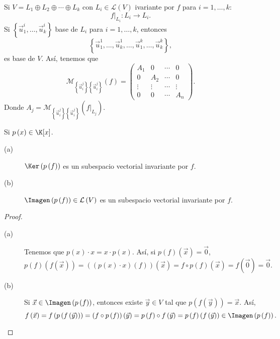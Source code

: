 \begin{observation}
\normalfont Si $\displaystyle V = L_{1} \oplus L_{2} \oplus \cdots \oplus L_{k} $ con $\displaystyle L_{i} \in \mathcal{L}\left(V\right) $ ivariante por $\displaystyle f $ para $\displaystyle i = 1, \ldots, k $:
\[f|_{L_{i}}:L_{i} \to L_{i} .\]
Si $\displaystyle \left\{ \vec{u}^{i}_{1}, \ldots, \vec{u}^{i}_{k}\right\}  $ base de $\displaystyle L_{i} $ para $\displaystyle i = 1, \ldots, k $, entonces 
\[ \left\{ \vec{u}^{1}_{1}, \ldots, \vec{u}^{1}_{k}, \ldots, \vec{u}^{k}_{1}, \ldots, \vec{u}^{k}_{k}\right\}  ,\]
es base de $\displaystyle V $. Así, tenemos que 
\[ \mathcal{M}_{ \left\{ \vec{u}^{j}_{i}\right\} \left\{ \vec{u}^{j}_{i}\right\} }\left(f\right) = \begin{pmatrix} A_{1} & 0 & \cdots & 0 \\
0 & A_{2} & \cdots & 0 \\
\vdots & \vdots & \cdots & \vdots \\
0 & 0 & \cdots & A_{n}\end{pmatrix} .\]
Donde $\displaystyle A_{j} = \mathcal{M}_{ \left\{ \vec{u}^{j}_{i}\right\} \left\{ \vec{u}^{j}_{i}\right\} } \left(f|_{L_{j}}\right)$.
\end{observation}
Si $\displaystyle p\left(x\right) \in \K[x] $.
\begin{fprop}[]
\normalfont 
\begin{description}
\item[(a)] $\displaystyle \Ker\left(p\left(f\right)\right) $ es un subespacio vectorial invariante por $\displaystyle f $.
\item[(b)] $\displaystyle \Imagen\left(p\left(f\right)\right)\in \mathcal{L}\left(V\right) $ es un subespacio vectorial invariante por $\displaystyle f $.
\end{description}
\end{fprop}
\begin{proof}
\begin{description}
\item[(a)] Tenemos que $\displaystyle p\left(x\right) \cdot x = x \cdot p\left(x\right) $. Así, si $\displaystyle p\left(f\right) \left(\vec{x}\right) = \vec{0} $, 
	\[p\left(f\right)\left(f\left(\vec{x}\right)\right) = \left(\left(p\left(x\right) \cdot x\right)\left(f\right)\right)\left(\vec{x}\right) = f \circ p\left(f\right)\left(\vec{x}\right) = f\left(\vec{0}\right) = \vec{0} .\]
\item[(b)] Si $\displaystyle \vec{x} \in \Imagen\left(p\left(f\right)\right) $, entonces existe $\displaystyle \vec{y} \in V $ tal que $\displaystyle p\left(f\left(\vec{y}\right)\right) = \vec{x} $. Así,
	\[f\left(\vec{x}\right) = f\left(p\left(f\left(\vec{y}\right)\right)\right) = \left(f\circ p\left(f\right)\right)\left(\vec{y}\right) = p\left(f\right) \circ f\left(\vec{y}\right) = p\left(f\right)\left( f\left(\vec{y}\right) \right) \in \Imagen\left(p\left(f\right)\right).\]	
\end{description}
\end{proof}
